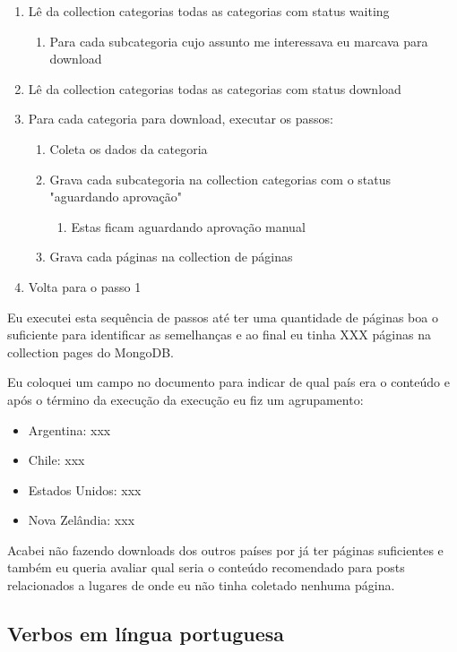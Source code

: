 \begin{enumerate}
    \item Lê da collection categorias todas as categorias com status waiting
    \begin{enumerate}
        \item Para cada subcategoria cujo assunto me interessava eu marcava para download
    \end{enumerate}
    \item Lê da collection categorias todas as categorias com status download
    \item Para cada categoria para download, executar os passos: 
    \begin{enumerate}
        \item Coleta os dados da categoria
        \item Grava cada subcategoria na collection categorias com o status "aguardando aprovação"
        \begin{enumerate}
            \item Estas ficam aguardando aprovação manual
        \end{enumerate}
        \item Grava cada páginas na collection de páginas
    \end{enumerate}
    \item Volta para o passo 1
\end{enumerate}

Eu executei esta sequência de passos até ter uma quantidade de páginas boa o suficiente para identificar as semelhanças e ao final eu tinha XXX páginas na collection pages do MongoDB.

Eu coloquei um campo no documento para indicar de qual país era o conteúdo e após o término da execução da execução eu fiz um agrupamento:
\begin{itemize}
    \item Argentina: xxx
    \item Chile: xxx
    \item Estados Unidos: xxx
    \item Nova Zelândia: xxx
\end{itemize}

Acabei não fazendo downloads dos outros países por já ter páginas suficientes e também eu queria avaliar qual seria o conteúdo recomendado para posts relacionados a lugares de onde eu não tinha coletado nenhuma página.


\subsection{Verbos em língua portuguesa}

